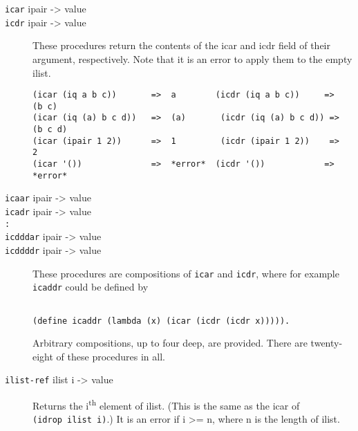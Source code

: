 \begin{description}
\item[\texttt{icar} ipair -\textgreater{} value\\
\texttt{icdr} ipair -\textgreater{} value ]
These procedures return the contents of the icar and icdr field of their
argument, respectively. Note that it is an error to apply them to the
empty ilist.

\begin{verbatim}
(icar (iq a b c))       =>  a        (icdr (iq a b c))     =>  (b c)  
(icar (iq (a) b c d))   =>  (a)       (icdr (iq (a) b c d)) =>  (b c d)
(icar (ipair 1 2))      =>  1         (icdr (ipair 1 2))    =>  2      
(icar '())              =>  *error*  (icdr '())            =>  *error*
\end{verbatim}

\href{}{} \href{}{} \href{}{} \href{}{}
\item[\texttt{icaar} ipair -\textgreater{} value\\
\texttt{icadr} ipair -\textgreater{} value\\
\texttt{:}\\
\texttt{icdddar} ipair -\textgreater{} value\\
\texttt{icddddr} ipair -\textgreater{} value ]
These procedures are compositions of \texttt{icar} and \texttt{icdr},
where for example \texttt{icaddr} could be defined by

\begin{verbatim}
    
(define icaddr (lambda (x) (icar (icdr (icdr x))))).
\end{verbatim}

Arbitrary compositions, up to four deep, are provided. There are
twenty-eight of these procedures in all. \href{}{}
\item[\texttt{ilist-ref} ilist i -\textgreater{} value ]
Returns the i\textsuperscript{th} element of ilist. (This is the same as
the icar of \texttt{(idrop\ ilist\ i)}.) It is an error if i
\textgreater{}= n, where n is the length of ilist.

\begin{verbatim}
    

\end{verbatim}
\end{description}
